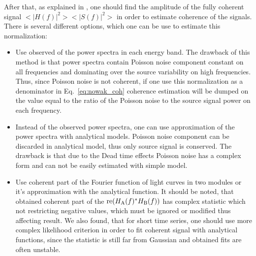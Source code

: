 \documentclass[a4paper,fleqn,usenatbib]{mnras}
\begin{document}
\begin{table}
After that, as explained in \citep{Nowak99}, one should find the amplitude of the fully coherent signal $<|H(f)|^2><|S(f)|^2>$ in order to estimate coherence of the signals. 
There is several different options, which one can be use to estimate this normalization:
\begin{itemize}
        \enumerate
        \item Use observed of the power spectra in each energy band. 
                The drawback of this method is that power spectra contain Poisson noise component constant on all frequencies and dominating over the source variability on high frequencies. 
                Thus, since Poisson noise is not coherent,  if one use this normalization as a denominator in Eq.~\ref{eq:nowak_coh} coherence estimation will be dumped on the value equal to the ratio of the Poisson noise to the source signal power on each frequency.
        \item Instead of the observed power spectra, one can use approximation of the power spectra with analytical models. 
                Poisson noise component can be discarded in analytical model, thus only source signal is conserved. 
                The drawback is that due to the Dead time effects Poisson noise has a complex form and can not be easily estimated with simple model.
        \item Use coherent part of the Fourier function of light curves in two modules \citep{2015ApJ...800..109B} or it's approximation with the analytical function. 
                It should be noted, that obtained coherent part of the ${\rm re}(H_{\rm A}(f)^*H_{\rm B}(f))$ has complex statistic which not restricting negative values, which must be ignored or modified thus affecting result.  
                We also found, that for short time series, one should use more complex likelihood criterion in order to fit coherent signal with analytical functions, since the statistic is still far from Gaussian and obtained fits are often unstable.
\end{itemize}


\end{table}
\end{document}
